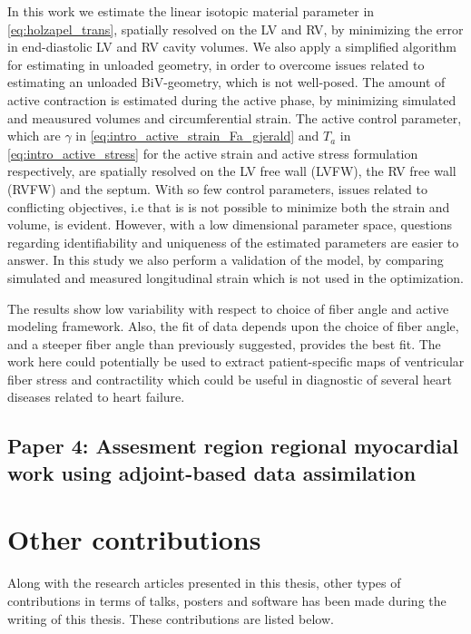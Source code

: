 In this work we estimate the linear isotopic material parameter in
\eqref{eq:holzapel_trans}, spatially resolved on the LV and RV, by
minimizing the error in end-diastolic LV and RV cavity volumes. We also
apply a simplified algorithm for estimating in unloaded geometry, in
order to overcome issues related to estimating an unloaded
BiV-geometry, which is not well-posed. The amount of active
contraction is estimated during the active phase, by minimizing
simulated and meausured volumes and circumferential strain. The active
control parameter, which are $\gamma$ in
\eqref{eq:intro_active_strain_Fa_gjerald}  and $T_a$ in
\eqref{eq:intro_active_stress} for the active strain and active stress
formulation respectively, are spatially resolved on the
LV free wall (LVFW), the RV free wall (RVFW) and the septum. With so
few control parameters, issues related to conflicting objectives, i.e
that is is not possible to minimize both the strain and volume, is
evident. However, with a low dimensional parameter space, questions
regarding identifiability and uniqueness of the estimated parameters
are easier to answer. In this study we also perform a validation of
the model, by comparing simulated and measured longitudinal strain
which is not used in the optimization. 

The results show low variability with respect to choice of fiber angle
and active modeling framework. Also, the fit of data depends upon the
choice of fiber angle, and a steeper fiber angle than previously
suggested, provides the best fit. The work here could potentially be
used to extract patient-specific maps of ventricular fiber stress and
contractility which could be useful in diagnostic of several heart
diseases related to heart failure. 




\subsection{Paper 4: Assesment region regional myocardial work using
  adjoint-based data assimilation}

\newpage
\section{Other contributions}
Along with the research articles presented in this thesis, other
types of contributions in terms of talks, posters and software has
been made during the writing of this thesis. These contributions are
listed below.

